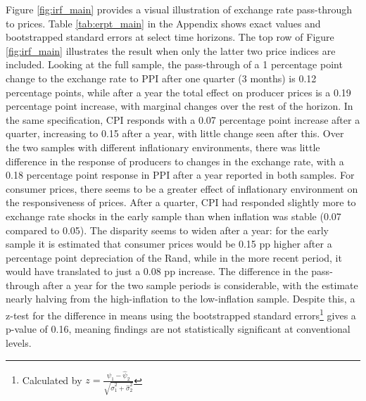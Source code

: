 \documentclass[12pt]{article}
\begin{document}
Figure \ref{fig:irf_main} provides a visual illustration of exchange rate pass-through to prices. Table \ref{tab:erpt_main} in the Appendix shows exact values and bootstrapped standard errors at select time horizons. The top row of Figure \ref{fig:irf_main} illustrates the result when only the latter two price indices are included. Looking at the full sample, the pass-through of a 1 percentage point change to the exchange rate to PPI after one quarter (3 months) is 0.12 percentage points, while after a year the total effect on producer prices is a 0.19 percentage point increase, with marginal changes over the rest of the horizon. In the same specification, CPI responds with a 0.07 percentage point increase after a quarter, increasing to 0.15 after a year, with little change seen after this. Over the two samples with different inflationary environments, there was little difference in the response of producers to changes in the exchange rate, with a 0.18 percentage point response in PPI after a year reported in both samples. For consumer prices, there seems to be a greater effect of inflationary environment on the responsiveness of prices. After a quarter, CPI had responded slightly more to exchange rate shocks in the early sample than when inflation was stable (0.07 compared to 0.05). The disparity seems to widen after a year: for the early sample it is estimated that consumer prices would be 0.15 pp higher after a percentage point depreciation of the Rand, while in the more recent period, it would have translated to just a 0.08 pp increase. The difference in the pass-through after a year for the two sample periods is considerable, with the estimate nearly halving from the high-inflation to the low-inflation sample. Despite this, a z-test for the difference in means using the bootstrapped standard errors\footnote{Calculated by $z = \frac{\hat{\psi}_1 - \hat{\psi}_2}{\sqrt{\hat{\sigma}_1^2 + \hat{\sigma}_2^2}}$} gives a p-value of 0.16, meaning findings are not statistically significant at conventional levels. 
\end{document}
